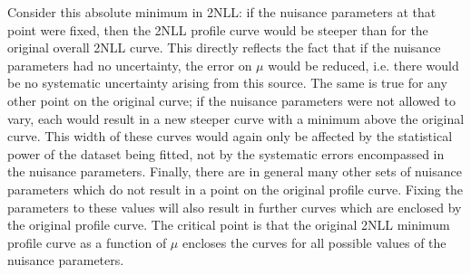 Consider this absolute minimum in 2NLL: if the nuisance parameters at that
point were fixed, then the 2NLL profile curve would be steeper than for
the original overall 2NLL curve. This directly reflects the fact that
if the nuisance parameters had no uncertainty,
the error on $\mu$ would be reduced, i.e. there would be no systematic 
uncertainty arising from this source.
The same is true for any other point on the original curve; if the nuisance
parameters were not allowed to vary, each would result in a new steeper curve
with a minimum above the original curve.
This width of these curves would again only be affected by the statistical
power of the dataset being fitted, not by the systematic errors encompassed
in the nuisance parameters.
Finally, there are in general
many other sets of nuisance parameters which do not result in a point on the
original profile curve. Fixing the parameters to these values will also result
in further curves which are enclosed by the original profile curve.
The critical point is that the original 2NLL minimum profile curve as a function
of $\mu$ encloses the curves for all possible values of the nuisance
parameters.

